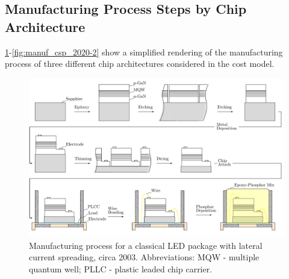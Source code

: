 \documentclass[10pt]{article}
\begin{document}
\subsection{Manufacturing Process Steps by Chip Architecture}

\cref{fig:manuf_classical_2003}-\cref{fig:manuf_csp_2020-2} show a simplified rendering of the manufacturing process of three different chip architectures considered in the cost model.


    \begin{landscape}
        \begin{figure}
            \includegraphics[width=555pt]{./figures/classical_overview_2003.pdf}
            \caption{Manufacturing process for a classical LED package with lateral current spreading, circa 2003. Abbreviations: MQW - multiple quantum well; PLLC - plastic leaded chip carrier.}
            \label{fig:manuf_classical_2003}
        \end{figure}
    \end{landscape}
    
\end{document}
